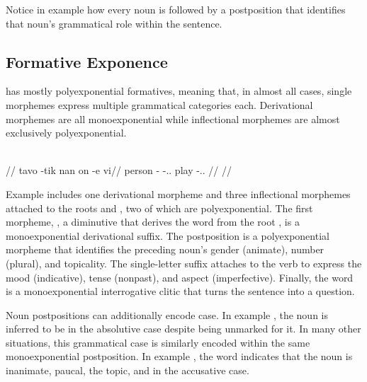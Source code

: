 Notice in example  how every noun is followed by a postposition that identifies that noun's grammatical role within the sentence.


\subsection{Formative Exponence}
\label{sec:tvk-exponence}

\langtvk{} has mostly polyexponential formatives, meaning that, in almost all cases, single morphemes express multiple grammatical categories each\autocite{wals-21}. Derivational morphemes are all monoexponential while inflectional morphemes are almost exclusively polyexponential.

	\begingl
		\glpreamble{}\\
		//
		\gla tavo -tik nan on -e vi//
		\glb person -\Dim{} -\An.\Pl.\Top{} play -\Ind.\Npst.\Ipfv{} \Int//
		\glft {}//
	\endgl
\xe

Example  includes one derivational morpheme and three inflectional morphemes attached to the roots  and , two of which are polyexponential. The first morpheme, , a diminutive that derives the word  from the root , is a monoexponential derivational suffix. The postposition  is a polyexponential morpheme that identifies the preceding noun's gender (animate), number (plural), and topicality. The single-letter suffix  attaches to the verb to express the mood (indicative), tense (nonpast), and aspect (imperfective). Finally, the word  is a monoexponential interrogative clitic that turns the sentence into a question.

Noun postpositions can additionally encode case. In example , the noun  is inferred to be in the absolutive case despite being unmarked for it. In many other situations, this grammatical case is similarly encoded within the same monoexponential postposition. In example , the word  indicates that the noun  is inanimate, paucal, the topic, and in the accusative case.


